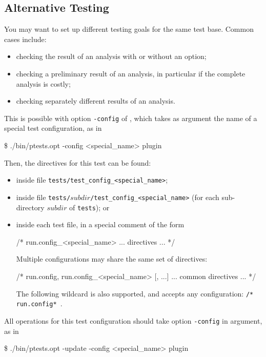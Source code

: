 \subsection{Alternative Testing}\label{ptests:alternative}

You may want to set up different testing goals for the same test
base. Common cases include:
\begin{itemize}
\item checking the result of an analysis with or without an option;
\item checking a preliminary result of an analysis, in particular if the
      complete analysis is costly;
\item checking separately different results of an analysis.
\end{itemize}

This is possible with option \texttt{-config} of \ptests, which takes as
argument the name of a special test configuration, as in
\begin{shell}
\$ ./bin/ptests.opt -config <special_name> plugin
\end{shell}

Then, the directives for this test can be found:
\begin{itemize}
\item inside file \texttt{tests/test\_config\_<special\_name>};
\item inside file \texttt{tests/$subdir$/test\_config\_<special\_name>} (for
  each sub-directory $subdir$ of \texttt{tests}); or
\item inside each test file, in a special comment of the
  form
\begin{listing-nonumber}
/* run.config_<special_name>
   ... directives ...
*/
\end{listing-nonumber}
Multiple configurations may share the same set of directives:
\begin{listing-nonumber}
/* run.config, run.config_<special_name> [, ...]
   ... common directives ...
*/
\end{listing-nonumber}
The following wildcard is also supported, and accepts any
configuration: \lstinline+/* run.config* +.
\end{itemize}

All operations for this test configuration should take option
\texttt{-config} in argument, as in
\begin{shell}
\$ ./bin/ptests.opt -update -config <special_name> plugin
\end{shell}

